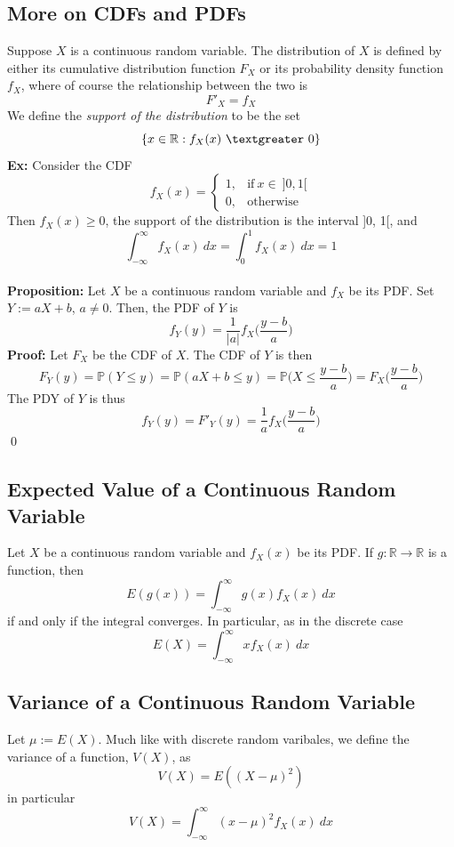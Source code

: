 \documentclass{article}
\newcommand{\ti}[1]{\textit{#1}}
\newcommand{\R}{\mathbb{R}}
\newcommand{\bbP}{\mathbb{P}}
\newcommand{\gt}{\textgreater}
\begin{document}
\subsection{More on CDFs and PDFs}
Suppose $X$ is a continuous random variable. The distribution of $X$ is defined by either its cumulative distribution function $F_{X}$ or its probability density function $f_{X}$, where of course the relationship between the two is
\[F'_{X} = f_{X}\]
We define the \ti{support of the distribution}  to be the set
\[\{x\in \R : f_{X}(x)\ \gt\ 0\}\]
\textbf{Ex:} Consider the CDF
\[
f_{X}(x) =
\begin{cases}
	1, &\text{if}\ x \in\ ]0, 1[\\
	0, &\text{otherwise}
\end{cases}
\]
Then $f_{X}(x) \geq 0$, the support of the distribution is the interval ]0, 1[, and
\[\int_{-\infty}^{\infty}f_{X}(x)\ dx = \int_{0}^{1} f_{X}(x)\ dx = 1\]\\
\textbf{Proposition:} Let $X$ be a continuous random variable and $f_{X}$ be its PDF. Set $Y := aX + b$, $a \neq 0$. Then, the PDF of $Y$ is
\[f_{Y}(y) = \frac{1}{|a|}f_{X}\bigg(\frac{y-b}{a}\bigg)\]
\textbf{Proof:} Let $F_{X}$ be the CDF of $X$. The CDF of $Y$ is then
\[F_{Y}(y) = \bbP(Y\leq y) = \bbP(aX + b \leq y) = \bbP\bigg(X \leq \frac{y-b}{a}\bigg) = F_{X}\bigg(\frac{y-b}{a}\bigg)\]
The PDY of $Y$ is thus
\[f_{Y}(y) = F'_{Y}(y) = \frac{1}{a} f_{X}\bigg(\frac{y-b}{a}\bigg)\]
\qed
\subsection{Expected Value of a Continuous Random Variable}
Let $X$ be a continuous random variable and $f_{X}(x)$ be its PDF. If $g : \R \to \R$ is a function, then
\[E(g(x)) = \int_{-\infty}^{\infty}g(x)f_{X}(x)\ dx\]
if and only if the integral converges. In particular, as in the discrete case
\[E(X) = \int_{-\infty}^{\infty} xf_{X}(x)\ dx\]
\subsection{Variance of a Continuous Random Variable}
Let $\mu := E(X)$. Much like with discrete random varibales, we define the variance of a function, $V(X)$, as
\[V(X) = E((X-\mu)^{2})\]
in particular
\[V(X) = \int_{-\infty}^{\infty} (x-\mu)^{2}f_{X}(x)\ dx\]
\end{document}
